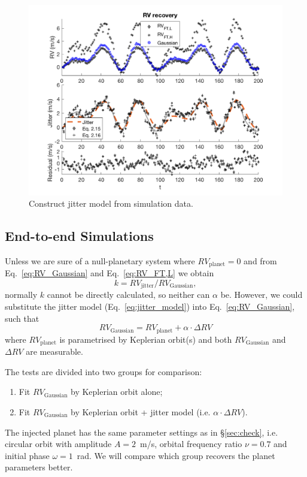 \begin{figure}[tbp]
\centering
\includegraphics[width = 0.99 \linewidth]
{./Figures/Methods/5-PLANET_AND_JITTER.png}
\caption[Jitter model]
{Construct jitter model from simulation data.}
\label{fig:PLANET_AND_JITTER}
\end{figure} 


\subsection{End-to-end Simulations}

Unless we are sure of a null-planetary system where $RV_\text{planet} = 0$ and
from Eq.~\ref{eq:RV_Gaussian} and Eq.~\ref{eq:RV_FT,L} we obtain
\begin{equation}
	k = RV_\text{jitter} / RV_\text{Gaussian},
\end{equation} 
normally $k$ cannot be directly calculated, so neither can $\alpha$ be.
However, we could substitute the jitter model (Eq.~\ref{eq:jitter_model}) into Eq.~\ref{eq:RV_Gaussian}, such that
\begin{equation}
	RV_\text{Gaussian} = RV_\text{planet} + \alpha \cdot \Delta RV
\label{eq:RV_fit}
\end{equation}
where $RV_\text{planet}$ is parametrised by Keplerian orbit(s) and both $RV_\text{Gaussian}$ and $\Delta RV$ 
are measurable. 

The tests are divided into two groups for comparison:
\begin{enumerate}
	\item Fit $RV_\text{Gaussian}$ by Keplerian orbit alone;
	\item Fit $RV_\text{Gaussian}$ by Keplerian orbit + jitter model (i.e. $\alpha \cdot \Delta RV$).
\end{enumerate}
The injected planet has the same parameter settings as in \S\ref{sec:check}, i.e. circular orbit with amplitude $A = 2$~m/s,
orbital frequency ratio $\nu = 0.7$ and initial phase $\omega = 1$~rad. We will compare which group recovers the 
planet parameters better. 

